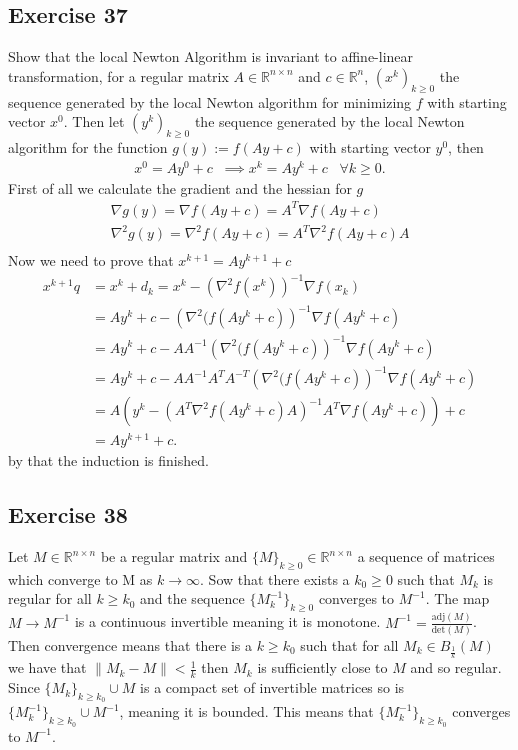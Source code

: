 \subsection{Exercise 37}
Show that the local Newton Algorithm is invariant to affine-linear
transformation, for a regular matrix $A \in \mathbb{R}^{n \times n}$ and $c
\in \mathbb{R}^{n}$, $(x^k)_{k\ge 0}$ the sequence generated by the local
Newton algorithm for minimizing $f$ with starting vector $x^0$. Then let
$(y^k)_{k\ge 0}$ the sequence generated by the local Newton algorithm for the
function $g(y) := f(Ay +c)$ with starting vector $y^0$, then
\begin{align}
    x^0 = Ay^0 + c \;\; \implies  x^k = Ay^k + c \;\;\; \forall k \ge 0.
\end{align}
First of all we calculate the gradient and the hessian for $g$
\begin{align}
    \nabla g(y) = \nabla f(Ay+c) = A^T \nabla f(Ay+c)\\
    \nabla^2 g(y) = \nabla^2 f(Ay+c) = A^T \nabla^2 f(Ay+c) A\\
\end{align}
Now we need to prove that $x^{k+1} = Ay^{k+1} + c$
\begin{align}
    x^{k+1}q
    &= x^{k} + d_k = x^{k} - \left( \nabla^2 f(x^{k})\right)^{-1}
    \nabla f(x_k)\\
    &=Ay^k + c - \left( \nabla^2(f(Ay^{k}+c )\right)^{-1} \nabla f(Ay^{k}+c)\\
    &=Ay^{k} + c - A A^{-1}\left( \nabla^2(f(Ay^{k}+c )\right)^{-1} \nabla f(Ay^{k}+c)\\
    &=Ay^{k} + c - A A^{-1} A^T A^{-T}\left( \nabla^2(f(Ay^{k}+c )\right)^{-1} \nabla f(Ay^{k}+c)\\
    &=A\left(y^{k} - \left( A^{T}\nabla^2 f(Ay^{k}+c)A\right)^{-1}A^T \nabla
    f(Ay^{k}+c ) \right)  +c \\
    &= Ay^{k+1} +c.
\end{align}
by that the induction is finished.
\subsection{Exercise 38}
Let $M \in \mathbb{R}^{n \times n}$ be a regular matrix and $\{M\}_{k\ge 0}
\in \mathbb{R}^{n \times n}$ a sequence of matrices which converge to M as $k
\to \infty $. Sow that there exists a $k_0 \ge 0$ such that $M_k$ is regular
for all $k\ge k_0$ and the sequence $\{M_k^{-1}\}_{k\ge 0}$ converges to
$M^{-1}$.
\newline
The map $M \to M^{-1}$ is a continuous invertible meaning it is monotone.
$M^{-1} = \frac{\text{adj}(M)}{\text{det}(M)}$. Then convergence means that
there is a $k\ge k_0$ such that for all $M_k \in B_{\frac{1}{k}}(M)$ we have
that $\|M_k -M\| < \frac{1}{k}$ then $M_k$ is sufficiently close to $M$ and
so regular. Since $\{M_k\}_{k\ge k_0} \cup {M}$ is a compact set
of invertible matrices so is $\{M_k^{-1}\}_{k\ge k_0} \cup {M^{-1}}$,
meaning it is bounded. This means that $\{M^{-1}_k\}_{k\ge k_0}$ converges to
$M^{-1}$.
